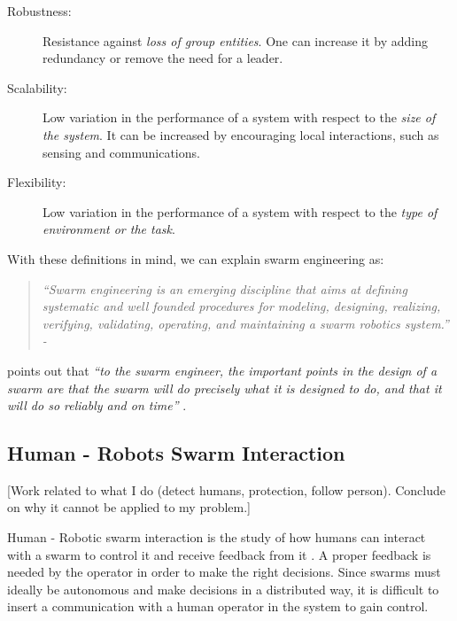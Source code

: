 \documentclass[oneside, a4paper, 12pt]{memoir}
\newcommand{\quoto}[2]{
\begin{quotation}
\textit{\enquote{#1} - #2}
\end{quotation}
}
\newcommand{\quot}[1]{\textit{\enquote{#1}}}
\begin{document}
\label{def:robustness_scalability_flexibility}
\begin{description}
\item[Robustness:] Resistance against \emph{loss of group entities}. One can increase it by adding redundancy or remove the need for a leader.
\item[Scalability:] Low variation in the performance of a system with respect to the \emph{size of the system}. It can be increased by encouraging local interactions, such as sensing and communications.
\item[Flexibility:] Low variation in the performance of a system with respect to the \emph{type of environment or the task}.
\end{description}

With these definitions in mind, we can explain swarm engineering as:

\quoto{Swarm engineering is an emerging discipline that aims at defining systematic and well founded procedures for modeling, designing, realizing, verifying, validating, operating, and maintaining a swarm robotics system.}{\cite{brambilla2013swarm}}

\citet{kazadi2000swarm} points out that \quot{to the swarm engineer, the important points in the design of a swarm are that the swarm will do precisely what it is designed to do, and that it will do so reliably and on time} \citep{kazadi2000swarm}.
	
	\subsection{Human - Robots Swarm Interaction}
	
	[Work related to what I do (detect humans, protection, follow person). Conclude on why it cannot be applied to my problem.]
	
	Human - Robotic swarm interaction is the study of how humans can interact with a swarm to control it and receive feedback from it \citep{brambilla2013swarm}. A proper feedback is needed by the operator in order to make the right decisions. Since swarms must ideally be autonomous and make decisions in a distributed way, it is difficult to insert a communication with a human operator in the system to gain control.
	
\end{document}
